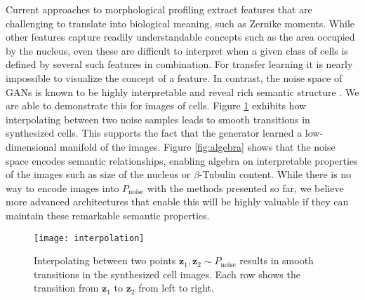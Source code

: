\documentclass{article}
\begin{document}
Current approaches to morphological profiling extract features that are
challenging to translate into biological meaning, such as Zernike moments. While
other features capture readily understandable concepts such as the area occupied
by the nucleus, even these are difficult to interpret when a given class of
cells is defined by several such features in combination. For transfer learning
it is nearly impossible to visualize the concept of a feature. In contrast, the
noise space of GANs is known to be highly interpretable and reveal rich
semantic structure \cite{radford2015unsupervised}. We are able to demonstrate
this for images of cells. Figure \ref{fig:interpolations} exhibits how
interpolating between two noise samples leads to smooth transitions in synthesized cells. This supports the fact that the generator learned a low-dimensional manifold of the images. Figure \ref{fig:algebra} shows
that the noise space encodes semantic relationships, enabling algebra on
interpretable properties of the images such as size of the nucleus or $\beta$-Tubulin content. While there is no way to encode images into $P_{\text{noise}}$ with the methods presented so far, we believe more advanced
architectures that enable this will be highly valuable if they can maintain these remarkable
semantic properties.

\begin{figure}
  \centering
  \texttt{[image: interpolation]}
  \caption{Interpolating between two points $\mathbf{z}_1, \mathbf{z}_2 \sim P_{\text{noise}}$ results in smooth transitions in the synthesized cell images. Each row shows the transition from $\mathbf{z}_1$ to $\mathbf{z}_2$ from left to right.}
  \label{fig:interpolations}
\end{figure}
\end{document}
